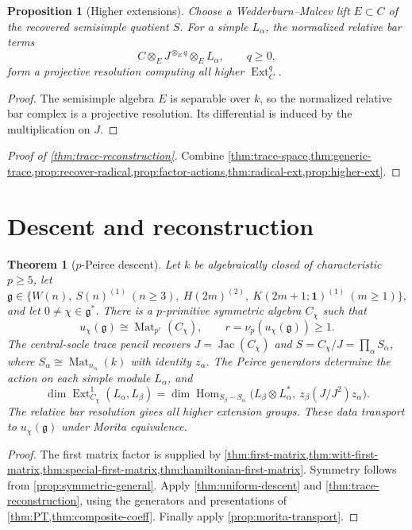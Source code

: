 \documentclass[11pt,reqno]{amsart}
\newtheorem{theorem}{Theorem}[section]
\newtheorem{proposition}[proposition]{Proposition}
\theoremstyle{definition}
\theoremstyle{remark}
\theoremstyle{definition}
\newcommand{\Mat}{\operatorname{Mat}}
\newcommand{\Jac}{\operatorname{Jac}}
\newcommand{\Hom}{\operatorname{Hom}}
\newcommand{\Ext}{\operatorname{Ext}}
\newcommand{\nuP}{\nu_p}
\begin{document}
\begin{proposition}[Higher extensions]\label{prop:higher-ext}
Choose a Wedderburn--Malcev lift $E\subset C$ of the recovered semisimple
quotient $S$.  For a simple $L_\alpha$, the normalized relative bar terms
\[
 C\otimes_EJ^{\otimes_Eq}\otimes_EL_\alpha,
 \qquad q\ge0,
\]
form a projective resolution computing all higher $\Ext_C^q$.
\end{proposition}

\begin{proof}
The semisimple algebra $E$ is separable over $k$, so the normalized relative
bar complex is a projective resolution.  Its differential is induced by the
multiplication on $J$.
\end{proof}

\begin{proof}[Proof of \cref{thm:trace-reconstruction}]
Combine \cref{thm:trace-space,thm:generic-trace,prop:recover-radical,prop:factor-actions,thm:radical-ext,prop:higher-ext}.
\end{proof}

\section{Descent and reconstruction}\label{sec:main}

\begin{theorem}[$p$-Peirce descent]
\label{thm:main}\label{thm:global}
Let $k$ be algebraically closed of characteristic $p\ge5$, let
\[
 \mathfrak g\in\{W(n),\ S(n)^{(1)}\ (n\ge3),\
 H(2m)^{(2)},\ K(2m+1;\mathbf1)^{(1)}\ (m\ge1)\},
\]
and let $0\ne\chi\in\mathfrak g^*$.
There is a $p$-primitive symmetric algebra $C_\chi$ such that
\[
 u_\chi(\mathfrak g)\cong\Mat_{p^r}(C_\chi),\qquad
 r=\nuP(u_\chi(\mathfrak g))\ge1.
\]
The central-socle trace pencil recovers $J=\Jac(C_\chi)$ and
$S=C_\chi/J=\prod_\alpha S_\alpha$, where
$S_\alpha\cong\Mat_{n_\alpha}(k)$ with identity $z_\alpha$.
The Peirce generators determine the action on each simple module
$L_\alpha$, and
\[
 \dim\Ext^1_{C_\chi}(L_\alpha,L_\beta)
 =\dim\Hom_{S_\beta-S_\alpha}
 \bigl(L_\beta\otimes L_\alpha^*,\ z_\beta(J/J^2)z_\alpha\bigr).
\]
The relative bar resolution gives all higher extension groups.
These data transport to $u_\chi(\mathfrak g)$ under Morita equivalence.
\end{theorem}

\begin{proof}
The first matrix factor is supplied by
\cref{thm:first-matrix,thm:witt-first-matrix,thm:special-first-matrix,thm:hamiltonian-first-matrix}.
Symmetry follows from \cref{prop:symmetric-general}.
Apply \cref{thm:uniform-descent} and
\cref{thm:trace-reconstruction}, using the generators and presentations
of \cref{thm:PT,thm:composite-coeff}.
Finally apply \cref{prop:morita-transport}.
\end{proof}
\end{document}
